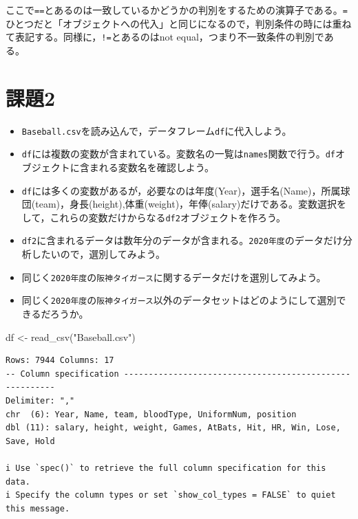 \documentclass[
  a4paper,
]{ltjsbook}
\newenvironment{Shaded}{\begin{snugshade}}{\end{snugshade}}
\newcommand{\FunctionTok}[1]{\textcolor[rgb]{0.28,0.35,0.67}{#1}}
\newcommand{\NormalTok}[1]{\textcolor[rgb]{0.00,0.23,0.31}{#1}}
\newcommand{\OtherTok}[1]{\textcolor[rgb]{0.00,0.23,0.31}{#1}}
\newcommand{\StringTok}[1]{\textcolor[rgb]{0.13,0.47,0.30}{#1}}
\providecommand{\tightlist}{%
  \setlength{\itemsep}{0pt}\setlength{\parskip}{0pt}}\usepackage{longtable,booktabs,array}
\begin{document}
ここで\texttt{==}とあるのは一致しているかどうかの判別をするための演算子である。\texttt{=}ひとつだと「オブジェクトへの代入」と同じになるので，判別条件の時には重ねて表記する。同様に，\texttt{!=}とあるのはnot
equal，つまり不一致条件の判別である。

\section{課題2}\label{ux8ab2ux984c2}

\begin{itemize}
\tightlist
\item
  \texttt{Baseball.csv}を読み込んで，データフレーム\texttt{df}に代入しよう。
\item
  \texttt{df}には複数の変数が含まれている。変数名の一覧は\texttt{names}関数で行う。\texttt{df}オブジェクトに含まれる変数名を確認しよう。
\item
  \texttt{df}には多くの変数があるが，必要なのは年度(Year)，選手名(Name)，所属球団(team)，身長(height),体重(weight)，年俸(salary)だけである。変数選択をして，これらの変数だけからなる\texttt{df2}オブジェクトを作ろう。
\item
  \texttt{df2}に含まれるデータは数年分のデータが含まれる。\texttt{2020年度}のデータだけ分析したいので，選別してみよう。
\item
  同じく\texttt{2020年度}の\texttt{阪神タイガース}に関するデータだけを選別してみよう。
\item
  同じく\texttt{2020年度}の\texttt{阪神タイガース}以外のデータセットはどのようにして選別できるだろうか。
\end{itemize}

\begin{Shaded}
\begin{Highlighting}[]
\NormalTok{df }\OtherTok{\textless{}{-}} \FunctionTok{read\_csv}\NormalTok{(}\StringTok{"Baseball.csv"}\NormalTok{)}
\end{Highlighting}
\end{Shaded}

\begin{verbatim}
Rows: 7944 Columns: 17
-- Column specification --------------------------------------------------------
Delimiter: ","
chr  (6): Year, Name, team, bloodType, UniformNum, position
dbl (11): salary, height, weight, Games, AtBats, Hit, HR, Win, Lose, Save, Hold

i Use `spec()` to retrieve the full column specification for this data.
i Specify the column types or set `show_col_types = FALSE` to quiet this message.
\end{verbatim}
\end{document}
